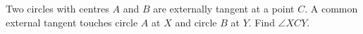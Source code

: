 Two circles with centres $A$ and $B$ are externally tangent at a point $C$. A common external tangent touches circle $A$ at $X$ and circle $B$ at $Y$. Find $\angle XCY$.
